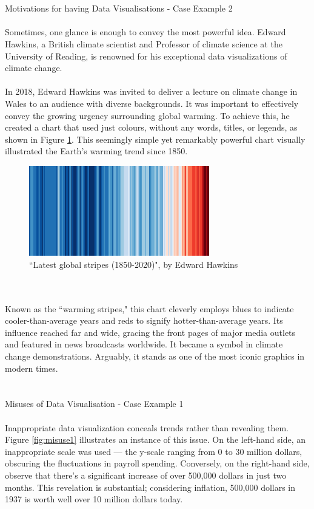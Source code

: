 \documentclass{article}\usepackage[]{graphicx}\usepackage[]{xcolor}
\begin{document}
\\  
\\Motivations for having Data Visualisations - Case Example 2
\\  
\\Sometimes, one glance is enough to convey the most powerful idea. Edward Hawkins, a British climate scientist and Professor of climate science at the University of Reading, is renowned for his exceptional data visualizations of climate change.
\\ 
\\In 2018, Edward Hawkins was invited to deliver a lecture on climate change in Wales to an audience with diverse backgrounds. It was important to effectively convey the growing urgency surrounding global warming. To achieve this, he created a chart that used just colours, without any words, titles, or legends, as shown in Figure \ref{fig:global}. This seemingly simple yet remarkably powerful chart visually illustrated the Earth's warming trend since 1850.
\begin{figure}[H]
    \centering
    \includegraphics[width=0.7\textwidth]{global.png}
    \caption{``Latest global stripes (1850-2020)", by Edward Hawkins}
    \label{fig:global}
\end{figure}
\\  
\\Known as the ``warming stripes," this chart cleverly employs blues to indicate cooler-than-average years and reds to signify hotter-than-average years. Its influence reached far and wide, gracing the front pages of major media outlets and featured in news broadcasts worldwide. It became a symbol in climate change demonstrations. Arguably, it stands as one of the most iconic graphics in modern times.
\\  
\\  
\\Misuses of Data Visualisation - Case Example 1
\\  
\\Inappropriate data visualization conceals trends rather than revealing them. Figure \ref{fig:misuse1} illustrates an instance of this issue. On the left-hand side, an inappropriate scale was used --- the y-scale ranging from 0 to 30 million dollars, obscuring the fluctuations in payroll spending. Conversely, on the right-hand side, observe that there's a significant increase of over 500,000 dollars in just two months. This revelation is substantial; considering inflation, 500,000 dollars in 1937 is worth well over 10 million dollars today.
\end{document}
